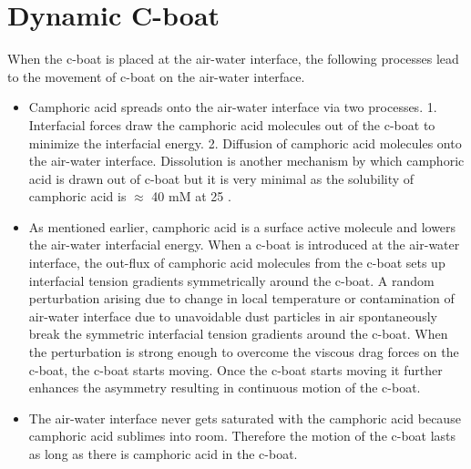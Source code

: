 \documentclass[aps, twocolumn, floatfix, superscriptaddress]{revtex4}
\begin{document}
\section{Dynamic C-boat}
When the c-boat is placed at the air-water interface, the following processes lead to the movement of c-boat on the air-water interface.
\begin{itemize}
\item Camphoric acid spreads onto the air-water interface via two processes. 1. Interfacial forces draw the camphoric acid molecules out of the c-boat to minimize the interfacial energy. 2. Diffusion of camphoric acid molecules onto the air-water interface. Dissolution is another mechanism by which camphoric acid is drawn out of c-boat but it is very minimal as the solubility of camphoric acid is $\approx$ 40 mM at 25 \celsius.
\item As mentioned earlier, camphoric acid is a surface active molecule and lowers the air-water interfacial energy. When a c-boat is introduced at the air-water interface, the out-flux of camphoric acid molecules from the c-boat sets up interfacial tension gradients symmetrically around the c-boat. A random perturbation arising due to change in local temperature or contamination of air-water interface due to unavoidable dust particles in air spontaneously break the symmetric interfacial tension gradients around the c-boat. When the perturbation is strong enough to overcome the viscous drag forces on the c-boat, the c-boat starts moving. Once the c-boat starts moving it further enhances the asymmetry resulting in continuous motion of the c-boat.
\item The air-water interface never gets saturated with the camphoric acid because camphoric acid sublimes into room. Therefore the motion of the c-boat lasts as long as there is camphoric acid in the c-boat.
\end{itemize}
\end{document}
